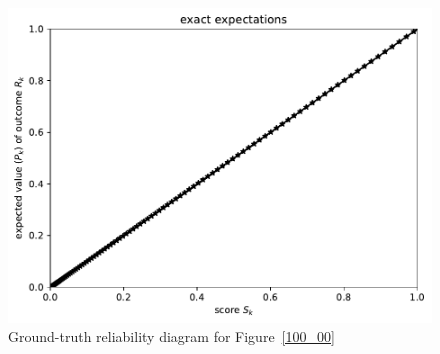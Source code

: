 \documentclass{article}
\begin{document}
\begin{figure}
\begin{centering}

\parbox{\imsize}{\includegraphics[width=\imsize]
                {./codes/unweighted/100_4_1_3/exact.pdf}}

\end{centering}
\caption{Ground-truth reliability diagram for Figure~\ref{100_00}}
\label{100_00e}
\end{figure}



\clearpage





\end{document}
